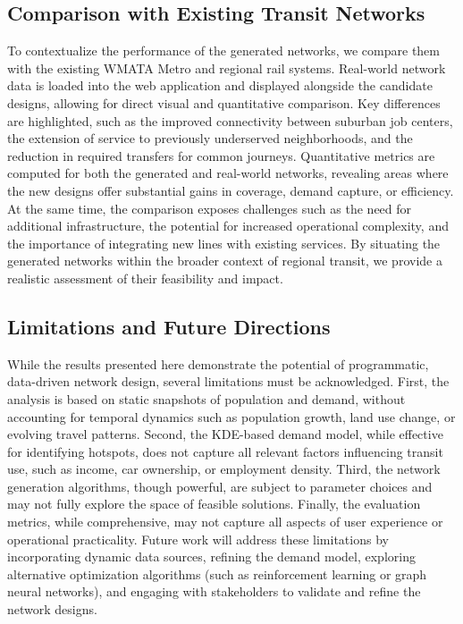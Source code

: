\documentclass[manuscript,screen,review]{acmart}
\begin{document}
\subsection{Comparison with Existing Transit Networks}
To contextualize the performance of the generated networks, we compare them with the existing WMATA Metro and regional rail systems. Real-world network data is loaded into the web application and displayed alongside the candidate designs, allowing for direct visual and quantitative comparison. Key differences are highlighted, such as the improved connectivity between suburban job centers, the extension of service to previously underserved neighborhoods, and the reduction in required transfers for common journeys. Quantitative metrics are computed for both the generated and real-world networks, revealing areas where the new designs offer substantial gains in coverage, demand capture, or efficiency. At the same time, the comparison exposes challenges such as the need for additional infrastructure, the potential for increased operational complexity, and the importance of integrating new lines with existing services. By situating the generated networks within the broader context of regional transit, we provide a realistic assessment of their feasibility and impact.

\subsection{Limitations and Future Directions}
While the results presented here demonstrate the potential of programmatic, data-driven network design, several limitations must be acknowledged. First, the analysis is based on static snapshots of population and demand, without accounting for temporal dynamics such as population growth, land use change, or evolving travel patterns. Second, the KDE-based demand model, while effective for identifying hotspots, does not capture all relevant factors influencing transit use, such as income, car ownership, or employment density. Third, the network generation algorithms, though powerful, are subject to parameter choices and may not fully explore the space of feasible solutions. Finally, the evaluation metrics, while comprehensive, may not capture all aspects of user experience or operational practicality. Future work will address these limitations by incorporating dynamic data sources, refining the demand model, exploring alternative optimization algorithms (such as reinforcement learning or graph neural networks), and engaging with stakeholders to validate and refine the network designs.
\end{document}
